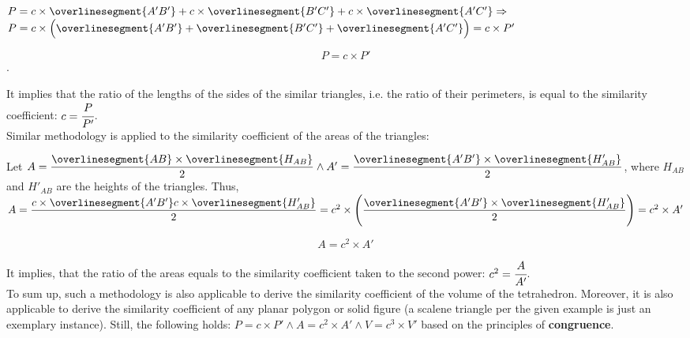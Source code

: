 \documentclass[10pt,a4paper]{article}
\begin{document}
$P = c \times \overlinesegment{A'B'} + c \times \overlinesegment{B'C'} + c 
\times \overlinesegment{A'C'} \Rightarrow$
$P = c \times \Big( \overlinesegment{A'B'} + \overlinesegment{B'C'} + \overlinesegment{A'C'} \Big) = c \times P'$

$$P = c \times P'$$.

It implies that the ratio of the lengths of the sides of the similar triangles, 
i.e. the ratio of their perimeters, is equal to the similarity coefficient:
$c = \cfrac{P}{P'}$. \\

Similar methodology is applied to the similarity coefficient of the areas of the triangles:

Let $
A = \dfrac{\overlinesegment{AB} \times \overlinesegment{H_{AB}}}{2} \land 
A' = \dfrac{\overlinesegment{A'B'} \times \overlinesegment{H'_{AB}}}{2}$,
where $H_{AB}$ and $H'_{AB}$ are the heights of the triangles. Thus,
$A = \dfrac{c \times \overlinesegment{A'B'} c \times \overlinesegment{H'_{AB}}}{2} = 
c^2 \times \Bigg( \dfrac{\overlinesegment{A'B'} \times \overlinesegment{H'_{AB}}}{2} \Bigg) = c^2 \times A'$

$$A = c^2 \times A'$$

It implies, that the ratio of the areas equals to the similarity coefficient 
taken to the second power: $c^2 = \cfrac{A}{A'}$. \\

To sum up, such a methodology is also applicable to derive the similarity coefficient 
of the volume of the tetrahedron. Moreover, it is also applicable to derive the similarity coefficient
of any planar polygon or solid figure (a scalene triangle per the given example is just an exemplary instance). 
Still, the following holds: $P = c \times P' \land A = c^2 \times A' \land V = c^3 \times V'$ 
based on the principles of \textbf{congruence}.

\end{document}
